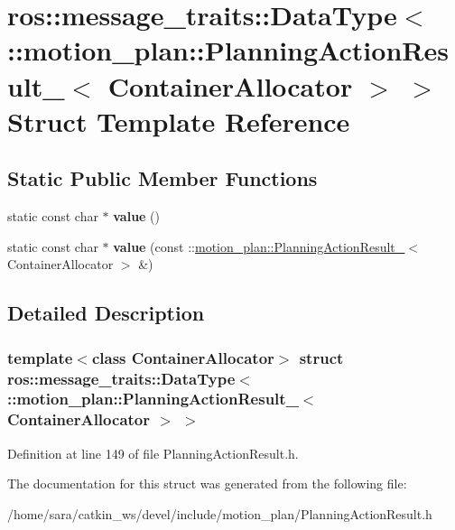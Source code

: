 \hypertarget{structros_1_1message__traits_1_1DataType_3_01_1_1motion__plan_1_1PlanningActionResult___3_01ContainerAllocator_01_4_01_4}{}\section{ros\+:\+:message\+\_\+traits\+:\+:Data\+Type$<$ \+:\+:motion\+\_\+plan\+:\+:Planning\+Action\+Result\+\_\+$<$ Container\+Allocator $>$ $>$ Struct Template Reference}
\label{structros_1_1message__traits_1_1DataType_3_01_1_1motion__plan_1_1PlanningActionResult___3_01ContainerAllocator_01_4_01_4}
\subsection*{Static Public Member Functions}
\begin{DoxyCompactItemize}
\item 
\mbox{\label{structros_1_1message__traits_1_1DataType_3_01_1_1motion__plan_1_1PlanningActionResult___3_01ContainerAllocator_01_4_01_4_a1dfed34c2d8d762b4e98a3f37abd30fd}} 
static const char $\ast$ {\bfseries value} ()
\item 
\mbox{\label{structros_1_1message__traits_1_1DataType_3_01_1_1motion__plan_1_1PlanningActionResult___3_01ContainerAllocator_01_4_01_4_a315b4ec7fe896c035009db2a9061015b}} 
static const char $\ast$ {\bfseries value} (const \+::\hyperlink{structmotion__plan_1_1PlanningActionResult__}{motion\+\_\+plan\+::\+Planning\+Action\+Result\+\_\+}$<$ Container\+Allocator $>$ \&)
\end{DoxyCompactItemize}


\subsection{Detailed Description}
\subsubsection*{template$<$class Container\+Allocator$>$\newline
struct ros\+::message\+\_\+traits\+::\+Data\+Type$<$ \+::motion\+\_\+plan\+::\+Planning\+Action\+Result\+\_\+$<$ Container\+Allocator $>$ $>$}



Definition at line 149 of file Planning\+Action\+Result.\+h.



The documentation for this struct was generated from the following file\+:\begin{DoxyCompactItemize}
\item 
/home/sara/catkin\+\_\+ws/devel/include/motion\+\_\+plan/Planning\+Action\+Result.\+h\end{DoxyCompactItemize}
